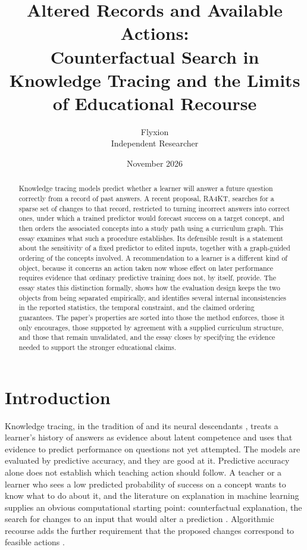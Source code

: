 \documentclass[11pt]{article}
\title{Altered Records and Available Actions:\\
Counterfactual Search in Knowledge Tracing and the Limits of Educational Recourse}
\author{Flyxion\\ Independent Researcher}
\date{November 2026}
\begin{document}
\maketitle

\begin{abstract}
\noindent Knowledge tracing models predict whether a learner will answer a future question correctly from a record of past answers. A recent proposal, RA4KT, searches for a sparse set of changes to that record, restricted to turning incorrect answers into correct ones, under which a trained predictor would forecast success on a target concept, and then orders the associated concepts into a study path using a curriculum graph. This essay examines what such a procedure establishes. Its defensible result is a statement about the sensitivity of a fixed predictor to edited inputs, together with a graph-guided ordering of the concepts involved. A recommendation to a learner is a different kind of object, because it concerns an action taken now whose effect on later performance requires evidence that ordinary predictive training does not, by itself, provide. The essay states this distinction formally, shows how the evaluation design keeps the two objects from being separated empirically, and identifies several internal inconsistencies in the reported statistics, the temporal constraint, and the claimed ordering guarantees. The paper's properties are sorted into those the method enforces, those it only encourages, those supported by agreement with a supplied curriculum structure, and those that remain unvalidated, and the essay closes by specifying the evidence needed to support the stronger educational claims.
\end{abstract}

\section{Introduction}

Knowledge tracing, in the tradition of \citet{corbett1994} and its neural descendants \citep{piech2015}, treats a learner's history of answers as evidence about latent competence and uses that evidence to predict performance on questions not yet attempted. The models are evaluated by predictive accuracy, and they are good at it. Predictive accuracy alone does not establish which teaching action should follow. A teacher or a learner who sees a low predicted probability of success on a concept wants to know what to do about it, and the literature on explanation in machine learning supplies an obvious computational starting point: counterfactual explanation, the search for changes to an input that would alter a prediction \citep{wachter2018,mothilal2020}. Algorithmic recourse adds the further requirement that the proposed changes correspond to feasible actions \citep{karimi2021}.
\end{document}
